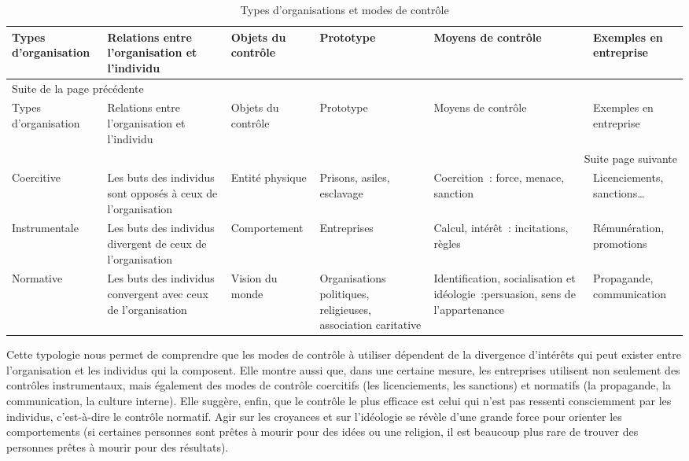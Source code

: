 \documentclass[oneside]{kaobook}
\begin{document}
{\sidenotesize
\begin{longtable}{p{2cm} p{3cm} p{2cm} p{2cm} p{3cm} p{2cm}}
\caption{Types d'organisations et modes de contrôle}
\\
Types d'organisation & Relations entre l'organisation et l'individu & Objets du contrôle & Prototype & Moyens de contrôle & Exemples en entreprise\\
\hline
\endfirsthead
\multicolumn{6}{l}{Suite de la page précédente} \\
\hline

Types d'organisation & Relations entre l'organisation et l'individu & Objets du contrôle & Prototype & Moyens de contrôle & Exemples en entreprise \\

\hline
\endhead
\hline\multicolumn{6}{r}{Suite page suivante} \\
\endfoot
\endlastfoot
\hline
Coercitive & Les buts des individus sont opposés à ceux de l'organisation & Entité physique & Prisons, asiles, esclavage & Coercition : force, menace, sanction & Licenciements, sanctions\ldots{}\\
Instrumentale & Les buts des individus divergent de ceux de l'organisation & Comportement & Entreprises & Calcul, intérêt :  incitations, règles & Rémunération, promotions\\
Normative & Les buts des individus convergent avec ceux de l'organisation & Vision du monde & Organisations politiques, religieuses, association caritative & Identification, socialisation et idéologie :persuasion, sens de l'appartenance & Propagande, communication\\
\end{longtable}}

Cette typologie nous permet de comprendre que les modes de contrôle à utiliser dépendent de la divergence d'intérêts qui peut exister entre l'organisation et les individus qui la composent. Elle montre aussi que, dans une certaine mesure, les entreprises utilisent non seulement des contrôles instrumentaux, mais également des modes de contrôle coercitifs (les licenciements, les sanctions) et normatifs (la propagande, la communication, la culture interne). Elle suggère, enfin, que le contrôle le plus efficace est celui qui n'est pas ressenti consciemment par les individus, c'est-à-dire le contrôle normatif. Agir sur les croyances et sur l'idéologie se révèle d'une grande force pour orienter les comportements (si certaines personnes sont prêtes à mourir pour des idées ou une religion, il est beaucoup plus rare de trouver des personnes prêtes à mourir pour des résultats).
\end{document}
